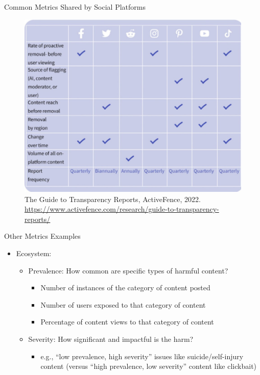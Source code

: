 \documentclass[nobackground,dvipsnames,table]{beamer}
\begin{document}
\begin{frame}{Common Metrics Shared by Social Platforms}
\begin{figure}
    \centering
    \includegraphics[scale = 0.4]{img/subfig2.jpg}
    \caption{The Guide to Transparency Reports, ActiveFence, 2022. \href{https://www.activefence.com/research/guide-to-transparency-reports/}{https://www.activefence.com/research/guide-to-transparency-reports/}}
\end{figure}

\end{frame}

\begin{frame}{Other Metrics Examples}
\begin{itemize}
    \item Ecosystem:
    \begin{itemize}
        \item Prevalence: How common are specific types of harmful content?
    
        \begin{itemize}
            \item Number of instances of the category of content posted
            \item Number of users exposed to that category of content
            \item Percentage of content views to that category of content
        \end{itemize}

        \item Severity: How significant and impactful is the harm?

        \begin{itemize}
            \item e.g., “low prevalence, high severity” issues like suicide/self-injury content (versus “high prevalence, low severity” content like clickbait)
        \end{itemize}
    \end{itemize} 
\end{itemize}
\end{frame}
\end{document}
